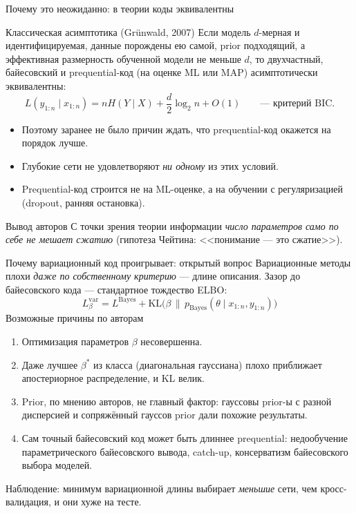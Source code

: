 \documentclass[aspectratio=169,10pt]{beamer}
\newcommand{\KL}{\mathrm{KL}}
\newcommand{\yx}{y_{1:n}\mid x_{1:n}}
\begin{document}
\begin{frame}{Почему это неожиданно: в теории коды эквивалентны}
  \begin{block}{Классическая асимптотика (Grünwald, 2007)}
    \small Если модель $d$-мерная и идентифицируемая, данные порождены ею самой, prior подходящий, а эффективная размерность обученной модели не меньше $d$, то двухчастный, байесовский и prequential-код (на оценке ML или MAP) асимптотически эквивалентны:
    \[
      L(\yx)=nH(Y\mid X)+\frac d2\log_2n+O(1)\qquad\text{--- критерий BIC.}
    \]
  \end{block}
  \begin{itemize}\small
    \item Поэтому заранее не было причин ждать, что prequential-код окажется на порядок лучше.
    \item Глубокие сети не удовлетворяют \emph{ни одному} из этих условий.
    \item Prequential-код строится не на ML-оценке, а на обучении с регуляризацией (dropout, ранняя остановка).
  \end{itemize}
  \begin{alertblock}{Вывод авторов}
    С точки зрения теории информации \emph{число параметров само по себе не мешает сжатию} (гипотеза Чейтина: <<понимание --- это сжатие>>).
  \end{alertblock}
\end{frame}

\begin{frame}{Почему вариационный код проигрывает: открытый вопрос}
  Вариационные методы плохи \emph{даже по собственному критерию} --- длине описания. Зазор до байесовского кода --- стандартное тождество ELBO:
  \[
    L^{\mathrm{var}}_\beta=L^{\mathrm{Bayes}}+\KL\big(\beta\,\big\|\,p_{\mathrm{Bayes}}(\theta\mid x_{1:n},y_{1:n})\big)
  \]
  \medskip
  \textcolor{structure}{Возможные причины по авторам}
  \begin{enumerate}
    \item Оптимизация параметров $\beta$ несовершенна.
    \item Даже лучшее $\beta^*$ из класса (диагональная гауссиана) плохо приближает апостериорное распределение, и KL велик.
    \item Prior, по мнению авторов, не главный фактор: гауссовы prior-ы с разной дисперсией и сопряжённый гауссов prior дали похожие результаты.
    \item Сам точный байесовский код может быть длиннее prequential: недообучение параметрического байесовского вывода, catch-up, консерватизм байесовского выбора моделей.
  \end{enumerate}
  Наблюдение: минимум вариационной длины выбирает \emph{меньшие} сети, чем кросс-валидация, и они хуже на тесте.
\end{frame}
\end{document}
